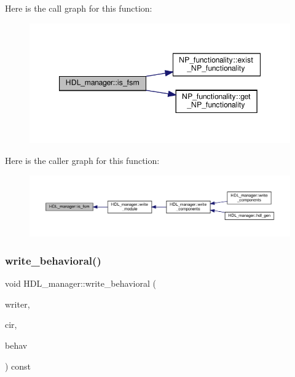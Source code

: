 Here is the call graph for this function\+:
\nopagebreak
\begin{figure}[H]
\begin{center}
\leavevmode
\includegraphics[width=347pt]{d7/d32/classHDL__manager_a75c6d3979d2d925fcbc76cbe9c9e5614_cgraph}
\end{center}
\end{figure}
Here is the caller graph for this function\+:
\nopagebreak
\begin{figure}[H]
\begin{center}
\leavevmode
\includegraphics[width=350pt]{d7/d32/classHDL__manager_a75c6d3979d2d925fcbc76cbe9c9e5614_icgraph}
\end{center}
\end{figure}
\mbox{\label{classHDL__manager_aa30e28273b99d8dbf65bceae373a963d}} 
\subsubsection{\texorpdfstring{write\+\_\+behavioral()}{write\_behavioral()}}
{\footnotesize\ttfamily void H\+D\+L\+\_\+manager\+::write\+\_\+behavioral (\begin{DoxyParamCaption}\item[{const \hyperlink{language__writer_8hpp_ab5bb59a651cbff3f3c83b0f51c0b0b71}{language\+\_\+writer\+Ref}}]{writer,  }\item[{const \hyperlink{structural__objects_8hpp_a8ea5f8cc50ab8f4c31e2751074ff60b2}{structural\+\_\+object\+Ref} \&}]{cir,  }\item[{const std\+::string \&}]{behav }\end{DoxyParamCaption}) const\hspace{0.3cm}{\ttfamily [private]}}



